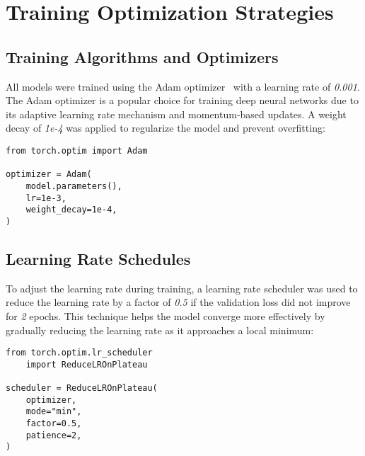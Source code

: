 \section{Training Optimization Strategies}

\subsection{Training Algorithms and Optimizers}\label{subsec:training-algorithms-optimizers}

All models were trained using the Adam optimizer~\cite{kingma2017adammethodstochasticoptimization} with a learning rate of \textit{0.001}. The Adam optimizer is a popular choice for training deep neural networks due to its adaptive learning rate mechanism and momentum-based updates. A weight decay of \textit{1e-4} was applied to regularize the model and prevent overfitting:

\begin{minipage}{0.9\linewidth}\begin{lstlisting}[caption={Adam optimizer with weight decay.},label={lst:adam-optimizer}]
from torch.optim import Adam

optimizer = Adam(
    model.parameters(),
    lr=1e-3,
    weight_decay=1e-4,
)
\end{lstlisting}\end{minipage}

\subsection{Learning Rate Schedules}

To adjust the learning rate during training, a learning rate scheduler was used to reduce the learning rate by a factor of \textit{0.5} if the validation loss did not improve for \textit{2} epochs. This technique helps the model converge more effectively by gradually reducing the learning rate as it approaches a local minimum:

\begin{minipage}{0.9\linewidth}\begin{lstlisting}[caption={ReduceLROnPlateau learning rate scheduler.},label={lst:lr-scheduler}]
from torch.optim.lr_scheduler
    import ReduceLROnPlateau

scheduler = ReduceLROnPlateau(
    optimizer,
    mode="min",
    factor=0.5,
    patience=2,
)
\end{lstlisting}\end{minipage}

